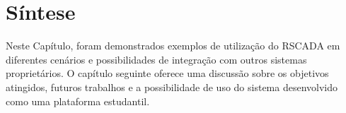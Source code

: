         \begin{figure}[!h]
    	\end{figure}
    	
\section{Síntese}
\label{sec:sintese-resultados}

Neste Capítulo, foram demonstrados exemplos de utilização do RSCADA em diferentes cenários e possibilidades de integração com outros sistemas proprietários. O capítulo seguinte oferece uma discussão sobre os objetivos atingidos, futuros trabalhos e a possibilidade de uso do sistema desenvolvido como uma plataforma estudantil.